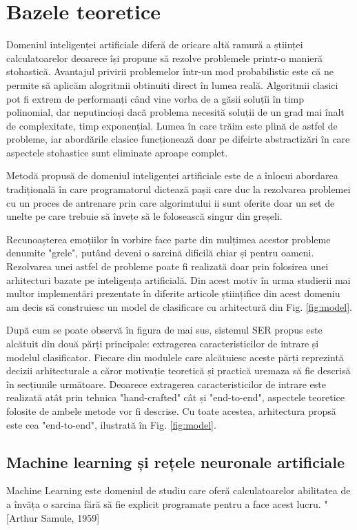 \documentclass[a4paper,12pt]{book}
\begin{document}
			\chapter{Bazele teoretice}				 
				 Domeniul inteligenței artificiale diferă de oricare altă ramură a științei calculatoarelor deoarece își propune să rezolve problemele printr-o manieră stohastică. Avantajul privirii problemelor într-un mod probabilistic este că ne permite să aplicăm alogritmii obtinuiti direct în lumea reală. Algoritmii clasici pot fi extrem de performanți când vine vorba de a găsii soluțîi în timp polinomial, dar neputincioși dacă problema necesită soluții de un grad mai înalt de complexitate, timp exponențial. Lumea în care trăim este plină de astfel de probleme, iar abordările clasice funcționează doar pe difeirte abstractizări în care aspectele stohastice sunt eliminate aproape complet. \par				 
				 Metodă propusă de domeniul inteligenței artificiale este de a înlocui abordarea tradițională în care programatorul dictează pașii care duc la rezolvarea problemei cu un proces de antrenare prin care algorimtului ii sunt oferite doar un set de unelte pe care trebuie să învețe să le folosească singur din greșeli. \par			 
				 Recunoașterea emoțiilor în vorbire face parte din mulțimea acestor probleme denumite "grele", putând deveni o sarcină dificilă chiar și pentru oameni. Rezolvarea unei astfel de probleme poate fi realizată doar prin folosirea unei arhitecturi bazate pe inteligența artificială. Din acest motiv în urma studierii mai multor implementări prezentate în diferite articole științifice din acest domeniu am decis să construiesc un model de clasificare cu arhitectură din Fig. \ref{fig:model}. \par
				 După cum se poate observă în figura de mai sus, sistemul SER propus este alcătuit din două părți principale: extragerea caracteristicilor de intrare și modelul clasificator. Fiecare din modulele care alcătuiesc aceste părți reprezintă decizii arhitecturale a căror motivație teoretică și practică uremaza să fie descrisă în secțiunile următoare. Deoarece extragerea caracteristicilor de intrare este realizată atât prin tehnica "hand-crafted" cât și "end-to-end", aspectele teoretice folosite de ambele metode vor fi descrise. Cu toate acestea, arhitectura propsă este cea "end-to-end", ilustrată în Fig. \ref{fig:model}.
			\section{Machine learning și rețele neuronale artificiale} \label{ml}
			Machine Learning este domeniul de studiu care oferă calculatoarelor abilitatea de a învăța o sarcina fără să fie explicit programate pentru a face acest lucru. " [Arthur Samule, 1959]  \par
			
\end{document}
